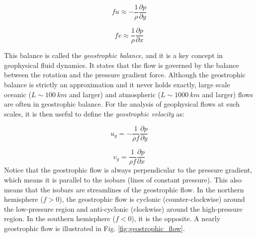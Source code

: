 \documentclass[12pt]{article}
\numberwithin{equation}{section}
\numberwithin{figure}{section}
\numberwithin{table}{section}
\begin{document}
\begin{equation}
  f u \approx - \frac{1}{\rho} \frac{\partial p}{\partial y}
\end{equation}

\begin{equation}
  f v \approx \frac{1}{\rho} \frac{\partial p}{\partial x}
\end{equation}

This balance is called the
\textit{geostrophic balance},
and it is a key concept in geophysical fluid dynamics.
It states that the flow is governed by the balance between the rotation and the
pressure gradient force.
Although the geostrophic balance is strictly an approximation and it never holds
exactly, large scale oceanic ($L \sim 100\ km$ and larger) and atmospheric
($L \sim 1000\ km$ and larger) flows are often in geostrophic balance.
For the analysis of geophysical flows at such scales, it is then useful to
define the \textit{geostrophic velocity} as:

\begin{equation}
  u_g = - \frac{1}{\rho f} \frac{\partial p}{\partial y}
  \label{eq:geostrophic_velocity_u}
\end{equation}

\begin{equation}
  v_g = \frac{1}{\rho f} \frac{\partial p}{\partial x}
  \label{eq:geostrophic_velocity_v}
\end{equation}
Notice that the geostrophic flow is always perpendicular to the pressure gradient,
which means it is parallel to the isobars (lines of constant pressure).
This also means that the isobars are streamlines of the geostrophic flow.
In the northern hemisphere ($f > 0$), the geostrophic flow is cyclonic
(counter-clockwise) around the low-pressure region and anti-cyclonic
(clockwise) around the high-pressure region.
In the southern hemisphere ($f < 0$), it is the opposite.
A nearly geostrophic flow is illustrated in Fig. \ref{fig:geostrophic_flow}.
\end{document}
